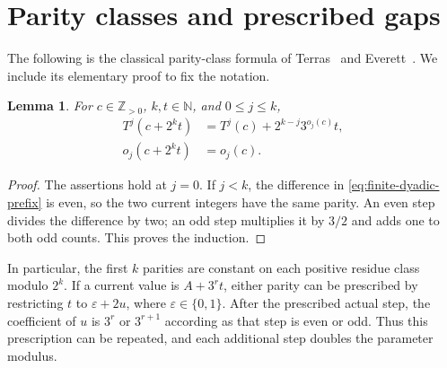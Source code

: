 \documentclass[11pt,a4paper]{article}
\newtheorem{lemma}[theorem]{Lemma}
\begin{document}
\section{Parity classes and prescribed gaps}

The following is the classical parity-class formula of
Terras~\cite{Terras1976} and Everett~\cite{Everett1977}.
We include its elementary proof to fix the notation.

\begin{lemma}\label{lem:finite-dyadic-prefix}
For $c\in\mathbb Z_{>0}$, $k,t\in\mathbb N$, and $0\le j\le k$,
\begin{align}
T^j(c+2^kt)
 &=T^j(c)+2^{k-j}3^{o_j(c)}t,
 \label{eq:finite-dyadic-prefix}\\
o_j(c+2^kt)&=o_j(c).
 \label{eq:finite-dyadic-count}
\end{align}
\end{lemma}
\begin{proof}
The assertions hold at $j=0$. If $j<k$, the difference in
\eqref{eq:finite-dyadic-prefix} is even, so the two current integers
have the same parity. An even step divides the difference by two;
an odd step multiplies it by $3/2$ and adds one to both odd counts.
This proves the induction.
\end{proof}

In particular, the first $k$ parities are constant on each positive
residue class modulo $2^k$. If a current value is $A+3^rt$, either
parity can be prescribed by restricting $t$ to $\varepsilon+2u$,
where $\varepsilon\in\{0,1\}$. After the prescribed actual step,
the coefficient of $u$ is $3^r$ or $3^{r+1}$ according as that
step is even or odd. Thus this prescription can be repeated, and
each additional step doubles the parameter modulus.
\end{document}
